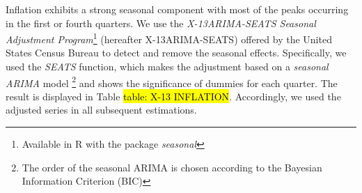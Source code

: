 Inflation exhibits a strong seasonal component with most of the peaks occurring in the first or fourth quarters. We use the \textit{X-13ARIMA-SEATS Seasonal Adjustment Program}\footnote{Available in R with the package \textit{seasonal}} (hereafter X-13ARIMA-SEATS) offered by the United States Census Bureau to detect and remove the seasonal effects. Specifically, we used the \textit{SEATS} function, which makes the adjustment based on a \textit{seasonal ARIMA} model \footnote{The order of the seasonal ARIMA is chosen according to the Bayesian Information Criterion (BIC)} and shows the significance of dummies for each quarter. The result is displayed in Table \hl{table: X-13 INFLATION}. Accordingly, we used the adjusted series in all subsequent estimations.
